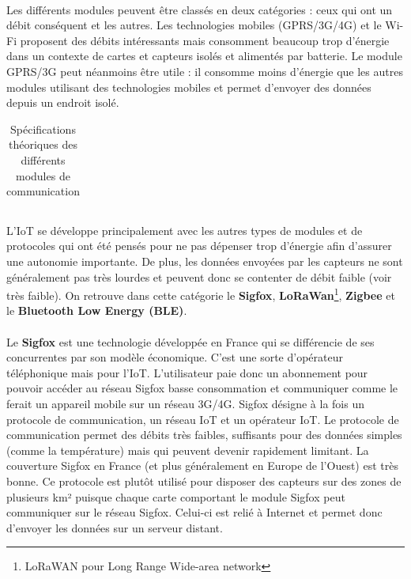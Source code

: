     \paragraph{} Les différents modules peuvent être classés en deux catégories : ceux qui ont un débit conséquent et les autres. Les technologies mobiles (GPRS/3G/4G) et le Wi-Fi proposent des débits intéressants mais consomment beaucoup trop d'énergie dans un contexte de cartes et capteurs isolés et alimentés par batterie. Le module GPRS/3G peut néanmoins être utile : il consomme moins d'énergie que les autres modules utilisant des technologies mobiles et permet d'envoyer des données depuis un endroit isolé.

    \begin{table}[h]
        \centering
        \begin{tabular}{C{2.7cm} | C{2.4cm} | C{2.6cm} | C{2.3cm} | C{2cm} | C{1.7cm}}
            
        \end{tabular}
        \caption{Spécifications théoriques des différents modules de communication}
        \label{tab:ondes}
    \end{table}

    
    \paragraph{}L'IoT se développe principalement avec les autres types de modules et de protocoles qui ont été pensés pour ne pas dépenser trop d'énergie afin d'assurer une autonomie importante. De plus, les données envoyées par les capteurs ne sont généralement pas très lourdes et peuvent donc se contenter de débit faible (voir très faible). On retrouve dans cette catégorie le \textbf{Sigfox}, \textbf{LoRaWan}\footnote{LoRaWAN pour Long Range Wide-area network}, \textbf{Zigbee} et le \textbf{Bluetooth Low Energy (BLE)}.

    \paragraph{}Le \textbf{Sigfox} est une technologie développée en France qui se différencie de ses concurrentes par son modèle économique. C'est une sorte d'opérateur téléphonique mais pour l'IoT. L'utilisateur paie donc un abonnement pour pouvoir accéder au réseau Sigfox basse consommation et communiquer comme le ferait un appareil mobile sur un réseau 3G/4G. Sigfox désigne à la fois un protocole de communication, un réseau IoT et un opérateur IoT. Le protocole de communication permet des débits très faibles, suffisants pour des données simples (comme la température) mais qui peuvent devenir rapidement limitant. La couverture Sigfox en France (et plus généralement en Europe de l'Ouest) est très bonne. Ce protocole est plutôt utilisé pour disposer des capteurs sur des zones de plusieurs km² puisque chaque carte comportant le module Sigfox peut communiquer sur le réseau Sigfox. Celui-ci est relié à Internet et permet donc d'envoyer les données sur un serveur distant.

